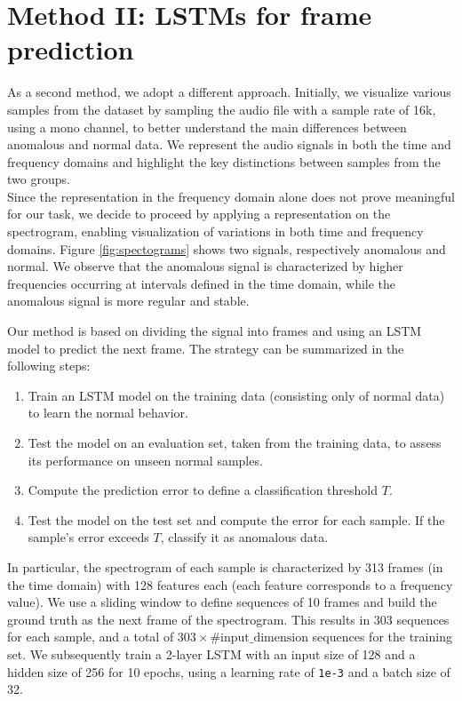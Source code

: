 \documentclass[ngerman]{scrartcl}
\begin{document}
\section*{Method II: LSTMs for frame prediction}

As a second method, we adopt a different approach. 
Initially, we visualize various samples from the dataset by sampling the audio file with a sample rate of 16k, using a mono channel, to better understand the main differences between anomalous and normal data. 
We represent the audio signals in both the time and frequency domains and highlight the key distinctions between samples from the two groups.
\\Since the representation in the frequency domain alone does not prove meaningful for our task, we decide to proceed by applying a representation on the spectrogram,
 enabling visualization of variations in both time and frequency domains. Figure \ref{fig:spectograms} shows two signals, respectively anomalous and normal. 
 We observe that the anomalous signal is characterized by higher frequencies occurring at intervals defined in the time domain, while the anomalous signal is more regular and stable.

Our method is based on dividing the signal into frames and using an LSTM model to predict the next frame. The strategy can be summarized in the following steps:
\begin{enumerate}
  \item Train an LSTM model on the training data (consisting only of normal data) to learn the normal behavior.
  \item Test the model on an evaluation set, taken from the training data, to assess its performance on unseen normal samples.
  \item Compute the prediction error to define a classification threshold \( T \).
  \item Test the model on the test set and compute the error for each sample. If the sample’s error exceeds \( T \), classify it as anomalous data.
\end{enumerate}


In particular, the spectrogram of each sample is characterized by 313 frames (in the time domain) with 128 features each (each feature corresponds to a frequency value). 
We use a sliding window to define sequences of 10 frames and build the ground truth as the next frame of the spectrogram. 
This results in 303 sequences for each sample, and a total of \(303 \times \text{\#input\_dimension}\) sequences for the training set.
We subsequently train a 2-layer LSTM with an input size of 128 and a hidden size of 256 for 10 epochs, using a learning rate of \texttt{1e-3} and a batch size of 32.
\end{document}
